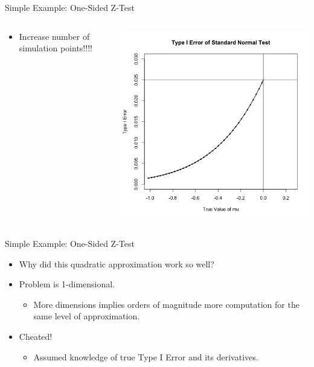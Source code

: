 \begin{frame}{Simple Example: One-Sided Z-Test}
\begin{columns}
\begin{column}{.3\textwidth}
\begin{itemize}
\item Increase number of simulation points!!!!
\end{itemize}
\end{column}

\begin{column}{.7\textwidth}
\includegraphics[width=\textwidth]{figures/z-test-12.png}
\end{column}
\end{columns}
\end{frame}

\begin{frame}{Simple Example: One-Sided Z-Test}
\begin{itemize}
    \item Why did this quadratic approximation work so well?
    \item Problem is 1-dimensional.
    \begin{itemize}
        \item More dimensions implies orders of magnitude more computation for the same level of approximation.
    \end{itemize}
    \item Cheated!
    \begin{itemize}
        \item Assumed knowledge of true Type I Error and its derivatives.
    \end{itemize}
\end{itemize}
\end{frame}

